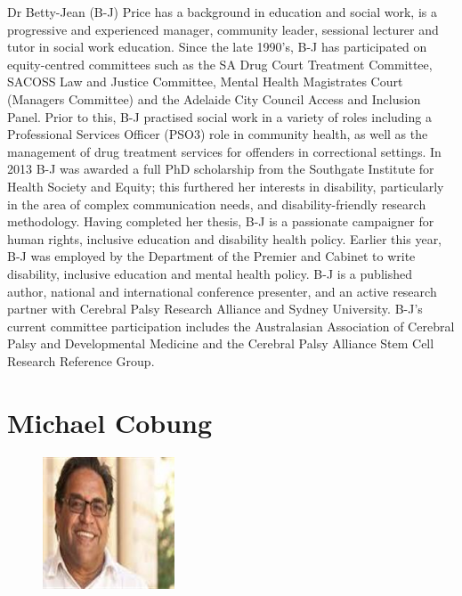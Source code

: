\documentclass[twoside,12pt,a4paper,notitlepage]{memoir}
\begin{document}
Dr Betty-Jean (B-J) Price has a background in education and social work, is a progressive and experienced manager, community leader, sessional lecturer and tutor in social work education.  Since the late 1990’s, B-J has participated on equity-centred committees such as the SA Drug Court Treatment Committee, SACOSS Law and Justice Committee, Mental Health Magistrates Court (Managers Committee) and the Adelaide City Council Access and Inclusion Panel.  Prior to this, B-J practised social work in a variety of roles including a Professional Services Officer (PSO3) role in community health, as well as the management of drug treatment services for offenders in correctional settings. In 2013 B-J was awarded a full PhD scholarship from the Southgate Institute for Health Society and Equity; this furthered her interests in disability, particularly in the area of complex communication needs, and disability-friendly research methodology. Having completed her thesis, B-J is a passionate campaigner for human rights, inclusive education and disability health policy. Earlier this year, B-J was employed by the Department of the Premier and Cabinet to write disability, inclusive education and mental health policy.  B-J is a published author, national and international conference presenter, and an active research partner with Cerebral Palsy Research Alliance and Sydney University.  B-J’s current committee participation includes the Australasian Association of Cerebral Palsy and Developmental Medicine and the Cerebral Palsy Alliance Stem Cell Research Reference Group.
\vfill


\clearpage{}
\vspace*{2cm}
\section*{Michael Cobung}

\begin{figure}
\centering
\includegraphics[width=0.35\textwidth]{michael_colbung.jpeg}
\end{figure}
\end{document}
